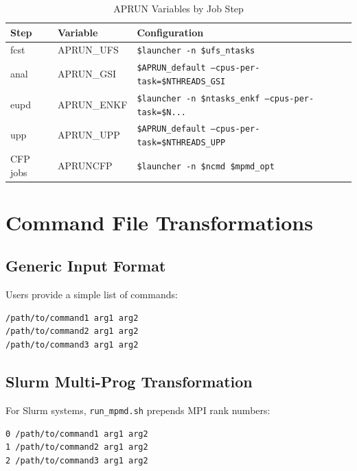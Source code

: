 \documentclass[11pt,a4paper,twoside]{article}
\begin{document}
\begin{table}[H]
\centering
\caption{APRUN Variables by Job Step}
\label{tab:aprun}
\begin{tabular}{@{}lll@{}}
\toprule
\textbf{Step} & \textbf{Variable} & \textbf{Configuration} \\
\midrule
fcst & APRUN\_UFS & \texttt{\$launcher -n \$ufs\_ntasks} \\
anal & APRUN\_GSI & \texttt{\$APRUN\_default --cpus-per-task=\$NTHREADS\_GSI} \\
eupd & APRUN\_ENKF & \texttt{\$launcher -n \$ntasks\_enkf --cpus-per-task=\$N...} \\
upp & APRUN\_UPP & \texttt{\$APRUN\_default --cpus-per-task=\$NTHREADS\_UPP} \\
CFP jobs & APRUNCFP & \texttt{\$launcher -n \$ncmd \$mpmd\_opt} \\
\bottomrule
\end{tabular}
\end{table}

\section{Command File Transformations}
\label{sec:transform}

\subsection{Generic Input Format}

Users provide a simple list of commands:

\begin{lstlisting}[style=bashstyle,caption={Generic MPMD Command File},label={lst:generic}]
/path/to/command1 arg1 arg2
/path/to/command2 arg1 arg2
/path/to/command3 arg1 arg2
\end{lstlisting}

\subsection{Slurm Multi-Prog Transformation}

For Slurm systems, \texttt{run\_mpmd.sh} prepends MPI rank numbers:

\begin{lstlisting}[style=bashstyle,caption={Slurm Multi-Prog Format},label={lst:slurm}]
0 /path/to/command1 arg1 arg2
1 /path/to/command2 arg1 arg2
2 /path/to/command3 arg1 arg2
\end{lstlisting}
\end{document}
